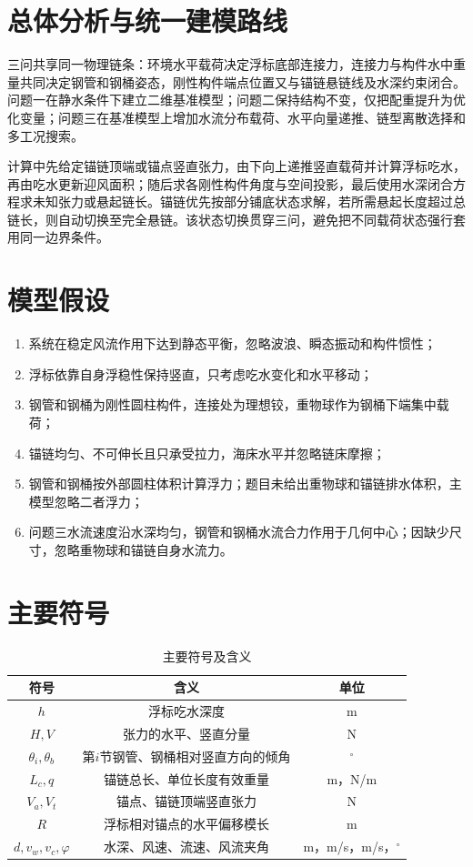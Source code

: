 \documentclass[UTF8,zihao=-4,a4paper,fontset=fandol]{ctexart}
\begin{document}
\section{总体分析与统一建模路线}
三问共享同一物理链条：环境水平载荷决定浮标底部连接力，连接力与构件水中重量共同决定钢管和钢桶姿态，刚性构件端点位置又与锚链悬链线及水深约束闭合。问题一在静水条件下建立二维基准模型；问题二保持结构不变，仅把配重提升为优化变量；问题三在基准模型上增加水流分布载荷、水平向量递推、链型离散选择和多工况搜索。

计算中先给定锚链顶端或锚点竖直张力，由下向上递推竖直载荷并计算浮标吃水，再由吃水更新迎风面积；随后求各刚性构件角度与空间投影，最后使用水深闭合方程求未知张力或悬起链长。锚链优先按部分铺底状态求解，若所需悬起长度超过总链长，则自动切换至完全悬链。该状态切换贯穿三问，避免把不同载荷状态强行套用同一边界条件。

\section{模型假设}
\begin{enumerate}
\item 系统在稳定风流作用下达到静态平衡，忽略波浪、瞬态振动和构件惯性；
\item 浮标依靠自身浮稳性保持竖直，只考虑吃水变化和水平移动；
\item 钢管和钢桶为刚性圆柱构件，连接处为理想铰，重物球作为钢桶下端集中载荷；
\item 锚链均匀、不可伸长且只承受拉力，海床水平并忽略链床摩擦；
\item 钢管和钢桶按外部圆柱体积计算浮力；题目未给出重物球和锚链排水体积，主模型忽略二者浮力；
\item 问题三水流速度沿水深均匀，钢管和钢桶水流合力作用于几何中心；因缺少尺寸，忽略重物球和锚链自身水流力。
\end{enumerate}

\section{主要符号}
\begin{table}[H]\centering
\caption{主要符号及含义}
\label{tab:symbols}
\begin{tabular}{ccc}
\toprule
符号 & 含义 & 单位\\
\midrule
$h$ & 浮标吃水深度 & m\\
$H,V$ & 张力的水平、竖直分量 & N\\
$\theta_i,\theta_b$ & 第$i$节钢管、钢桶相对竖直方向的倾角 & $^\circ$\\
$L_c,q$ & 锚链总长、单位长度有效重量 & m，N/m\\
$V_a,V_t$ & 锚点、锚链顶端竖直张力 & N\\
$R$ & 浮标相对锚点的水平偏移模长 & m\\
$d,v_w,v_c,\varphi$ & 水深、风速、流速、风流夹角 & m，m/s，m/s，$^\circ$\\
\bottomrule
\end{tabular}
\end{table}
\end{document}
